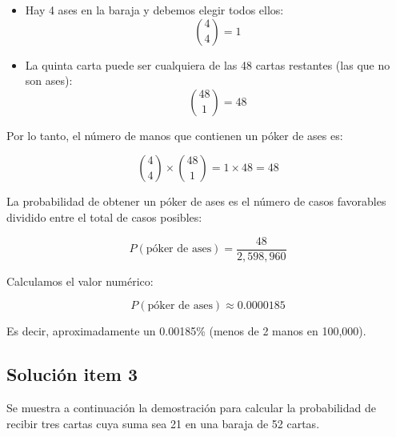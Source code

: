 \documentclass[a4paper,12pt]{article}
\begin{document}
	\begin{itemize}
		\item Hay 4 ases en la baraja y debemos elegir todos ellos:
		\begin{equation}
			\binom{4}{4} = 1
		\end{equation}
		\item La quinta carta puede ser cualquiera de las 48 cartas restantes (las que no son ases):
		\begin{equation}
			\binom{48}{1} = 48
		\end{equation}
	\end{itemize}
	
	Por lo tanto, el número de manos que contienen un póker de ases es:
	
	\begin{equation}
		\binom{4}{4} \times \binom{48}{1} = 1 \times 48 = 48
	\end{equation}
	
	
	La probabilidad de obtener un póker de ases es el número de casos favorables dividido entre el total de casos posibles:
	
	\begin{equation}
		P(\text{póker de ases}) = \frac{48}{2,598,960}
	\end{equation}
	
	Calculamos el valor numérico:
	
	\begin{equation}
		P(\text{póker de ases}) \approx 0.0000185
	\end{equation}
	
	Es decir, aproximadamente un 0.00185\% (menos de 2 manos en 100,000).
	
	
	
	
	
	\subsection{Soluci\'on item 3}
		
		Se muestra a continuación la demostración para calcular la probabilidad de recibir tres cartas cuya suma sea 21 en una baraja de 52 cartas.
		
\end{document}
